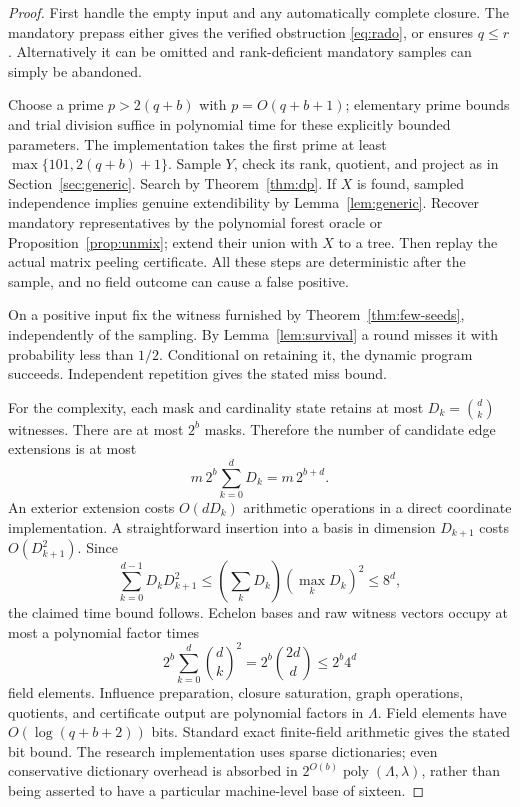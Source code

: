 \documentclass[11pt,letterpaper]{article}
\theoremstyle{definition}
\newcommand{\poly}{\operatorname{poly}}
\begin{document}
\begin{proof}
First handle the empty input and any automatically complete closure. The
mandatory prepass either gives the verified obstruction
\eqref{eq:rado}, or ensures $q\leq r$. Alternatively it can be omitted and
rank-deficient mandatory samples can simply be abandoned.

Choose a prime $p>2(q+b)$ with $p=O(q+b+1)$; elementary prime bounds and
trial division suffice in polynomial time for these explicitly bounded
parameters. The implementation takes the first prime at least
$\max\{101,2(q+b)+1\}$. Sample $Y$, check its rank, quotient, and project
as in Section~\ref{sec:generic}. Search by Theorem~\ref{thm:dp}.
If $X$ is found, sampled independence implies genuine extendibility by
Lemma~\ref{lem:generic}. Recover mandatory representatives by the
polynomial forest oracle or Proposition~\ref{prop:unmix}; extend their
union with $X$ to a tree. Then replay the actual matrix peeling certificate.
All these steps are deterministic after the sample, and no field outcome
can cause a false positive.

On a positive input fix the witness furnished by
Theorem~\ref{thm:few-seeds}, independently of the sampling. By
Lemma~\ref{lem:survival} a round misses it with probability less than
$1/2$. Conditional on retaining it, the dynamic program succeeds. Independent
repetition gives the stated miss bound.

For the complexity, each mask and cardinality state retains at most
$D_k=\binom dk$ witnesses. There are at most $2^b$ masks. Therefore the
number of candidate edge extensions is at most
\[
 m\,2^b\sum_{k=0}^{d}D_k=m\,2^{b+d}.
\]
An exterior extension costs $O(dD_k)$ arithmetic operations in a direct
coordinate implementation. A straightforward insertion into a basis in
dimension $D_{k+1}$ costs $O(D_{k+1}^2)$. Since
\[
 \sum_{k=0}^{d-1}D_kD_{k+1}^2
 \leq \left(\sum_kD_k\right)\left(\max_kD_k\right)^2
 \leq8^d,
\]
the claimed time bound follows. Echelon bases and raw witness vectors occupy
at most a polynomial factor times
\[
 2^b\sum_{k=0}^{d}\binom dk^2
   =2^b\binom{2d}{d}\leq2^b4^d
\]
field elements. Influence preparation, closure saturation, graph operations,
quotients, and certificate output are polynomial factors in $\Lambda$.
Field elements have $O(\log(q+b+2))$ bits. Standard exact finite-field
arithmetic gives the stated bit bound. The research implementation uses
sparse dictionaries; even conservative dictionary overhead is absorbed in
$2^{O(b)}\poly(\Lambda,\lambda)$, rather than being asserted to have a
particular machine-level base of sixteen.
\end{proof}
\end{document}
